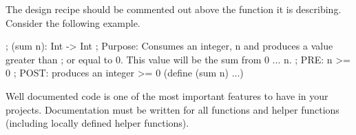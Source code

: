 The design recipe should be commented out above the function it is describing. Consider the following example.\\


\begin{code}[Lisp]
; (sum n): Int -> Int
; Purpose: Consumes an integer, n and produces a value greater than
;          or equal to 0. This value will be the sum from 0 ... n.
; PRE: n >= 0
; POST: produces an integer >= 0
(define (sum n)
	...)
\end{code}

Well documented code is one of the most important features to have in your projects. Documentation must be written for all functions and helper functions (including locally defined helper functions).
